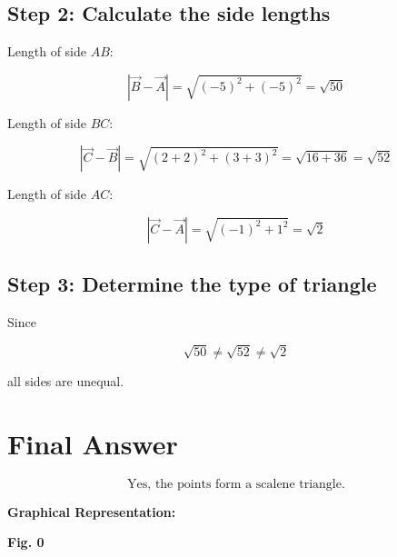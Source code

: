 \documentclass[journal]{IEEEtran}
\begin{document}
  \subsection*{Step 2: Calculate the side lengths}

Length of side \(AB\):

\begin{equation}
|\vec{B} - \vec{A}| = \sqrt{(-5)^2 + (-5)^2} = \sqrt{50} \tag{6}
\end{equation}

Length of side \(BC\):

\begin{equation}
|\vec{C} - \vec{B}| = \sqrt{(2 + 2)^2 + (3 + 3)^2} = \sqrt{16 + 36} = \sqrt{52} \tag{7}
\end{equation}

Length of side \(AC\):

\begin{equation}
|\vec{C} - \vec{A}| = \sqrt{(-1)^2 + 1^2} = \sqrt{2} \tag{8}
\end{equation}



\subsection*{Step 3: Determine the type of triangle}

Since

\[
\sqrt{50} \neq \sqrt{52} \neq \sqrt{2}
\]

all sides are unequal.

\section*{Final Answer}

\[
\boxed{
\text{Yes, the points form a scalene triangle.}
}
\]


\textbf{Graphical Representation:}

\begin{center}
    
    \vspace{0.5cm} %
    \textbf{Fig. 0}

\end{center}
\end{document}
